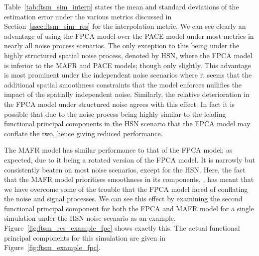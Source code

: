 Table~\ref{tab:ftsm_sim_interp} states the mean and standard deviations of the estimation error under the various metrics discussed in Section~\ref{ssec:ftsm_sim_res} for the interpolation metric.
We can see clearly an advantage of using the FPCA model over the PACE model under most metrics in nearly all noise process scenarios.
The only exception to this being under the highly structured spatial noise process, denoted by HSN, where the FPCA model is inferior to the MAFR and PACE models; though only slightly.
This advantage is most prominent under the independent noise scenarios where it seems that the additional spatial smoothness constraints that the model enforces nullifies the impact of the spatially independent noise.
Similarly, the relative deterioration in the FPCA model under structured noise agrees with this effect.
In fact it is possible that due to the noise process being highly similar to the leading functional principal components in the HSN scenario that the FPCA model may conflate the two, hence giving reduced performance.

The MAFR model has similar performance to that of the FPCA model; as expected, due to it being a rotated version of the FPCA model.
It is narrowly but consistently beaten on most noise scenarios, except for the HSN.
Here, the fact that the MAFR model prioritises smoothness in its components, \citep{hooker_maximal_2016}, has meant that we have overcome some of the trouble that the FPCA model faced of conflating the noise and signal processes. 
We can see this effect by examining the second functional principal component for both the FPCA and MAFR model for a single simulation under the HSN noise scenario as an example.
Figure~\ref{fig:ftsm_res_example_fpc} shows exactly this.
The actual functional principal components for this simulation are given in Figure~\ref{fig:ftsm_example_fpc}.

